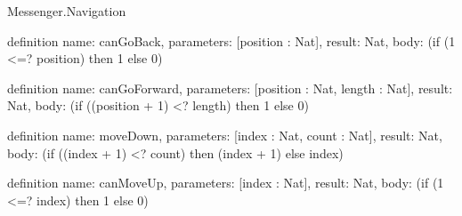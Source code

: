 \begin{lexlean}{Messenger.Navigation}
\begin{semanticmodule}
definition{
  name: canGoBack,
  parameters: [position : Nat],
  result: Nat,
  body: (if (1 <=? position) then 1 else 0)
}

definition{
  name: canGoForward,
  parameters: [position : Nat, length : Nat],
  result: Nat,
  body: (if ((position + 1) <? length) then 1 else 0)
}

definition{
  name: moveDown,
  parameters: [index : Nat, count : Nat],
  result: Nat,
  body: (if ((index + 1) <? count) then (index + 1) else index)
}

definition{
  name: canMoveUp,
  parameters: [index : Nat],
  result: Nat,
  body: (if (1 <=? index) then 1 else 0)
}
\end{semanticmodule}
\end{lexlean}
